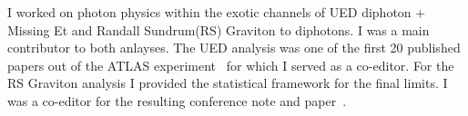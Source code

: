 I worked on photon physics within the exotic channels of UED diphoton + Missing Et and Randall Sundrum(RS) Graviton to diphotons. I was a main contributor to both anlayses.  The UED analysis was one of the first 20 published papers
out of the ATLAS experiment~\cite{atl2} for which I served as a co-editor. For the RS Graviton analysis I provided the statistical framework for the final limits. I was a co-editor for the resulting conference note and paper~\cite{atl1,atl1-conf}.

